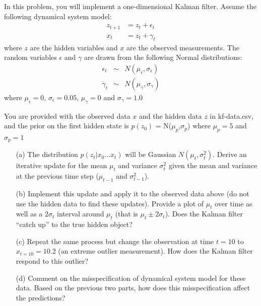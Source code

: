 \documentclass[submit]{harvardml}
\newcommand{\mueps}{\mu_{\epsilon}}
\newcommand{\sigeps}{\sigma_{\epsilon}}
\newcommand{\mugam}{\mu_{\gamma}}
\newcommand{\siggam}{\sigma_{\gamma}}
\newcommand{\muzp}{\mu_{p}}
\newcommand{\sigzp}{\sigma_{p}}
\begin{document}
        \begin{problem}
            In this problem, you will implement a one-dimensional Kalman filter.
            Assume the following dynamical system model:
            \begin{eqnarray*}
                z_{t+1} &= z_{t} + \epsilon_{t} \\
                x_{t} & = z_{t} + \gamma_{t}  
            \end{eqnarray*}
            where $z$ are the hidden variables and $x$ are the observed
            measurements.  The random variables $\epsilon$ and $\gamma$ are
            drawn from the following Normal distributions:
            \begin{eqnarray*}
                \epsilon_t &\sim& N(\mueps,\sigeps) \\
                \gamma_t &\sim& N(\mugam,\siggam) 
            \end{eqnarray*}
            where $\mueps = 0$, $\sigeps=0.05$, $\mugam = 0$ and $\siggam=1.0$

            You are provided with the observed data $x$ and the hidden data $z$ in kf-data.csv, and
            the prior on the first hidden state is $p(z_0)$ = N($\muzp$,$\sigzp$) where $\muzp = 5$
            and $\sigzp=1$


            \begin{itemize}
                \item[(a)] The distribution $p(z_t|x_0...x_t)$ will be Gaussian
                    $N(\mu_t,\sigma^2_t)$. Derive an iterative update for the mean
                    $\mu_t$ and variance $\sigma^2_t$ given the mean and variance
                    at the previous time step ($\mu_{t-1}$ and  $\sigma^2_{t-1}$).

				\item[(b)] Implement this update and apply it to the observed data
					above (do not use the hidden data to find these updates). Provide a plot of $\mu_t$ over time as well as a
					$2\sigma_t$ interval around $\mu_t$ (that is $\mu_t \pm
					2\sigma_t$).  Does the Kalman filter ``catch up'' to the true
					hidden object?

				\item[(c)] Repeat the same process but change the observation
					at time $t=10$ to $x_{t=10}=10.2$ (an extreme outlier
					measurement).  How does the Kalman filter respond to this
					outlier?  

				\item[(d)] Comment on the misspecification of dynamical system
					model for these data.  Based on the previous two parts, how
					does this misspecification affect the predictions?

			\end{itemize}    
\end{problem}
\end{document}
